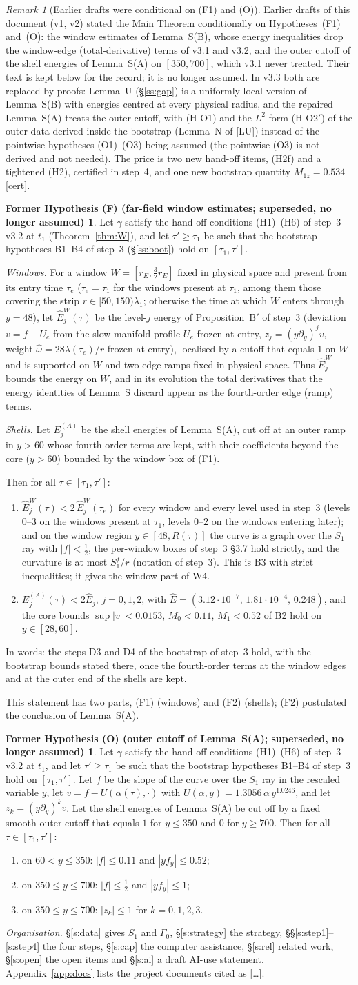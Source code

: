 \documentclass[11pt]{amsart}
\theoremstyle{definition}
\newtheorem*{hypF}{Former Hypothesis (F) (far-field window estimates; superseded, no longer assumed)}
\newtheorem*{hypO}{Former Hypothesis (O) (outer cutoff of Lemma~S(A); superseded, no longer assumed)}
\theoremstyle{remark}
\newtheorem{remark}[theorem]{Remark}
\newcommand{\dref}[1]{[\textsf{#1}]}
\newcommand{\GAPSTATEMENT}{%
Let $\gamma$ satisfy the hand-off conditions \textup{(H1)--(H6)} of step~3 \textup{v3.2} at $t_1$ \textup{(Theorem~\ref{thm:W})}, and let $\tau'\ge\tau_1$ be such that the bootstrap hypotheses \textup{B1--B4} of step~3 \textup{(\S\ref{ss:boot})} hold on $[\tau_1,\tau']$.

\emph{Windows.} For a window $W=[r_E,\frac32r_E]$ fixed in physical space and present from its entry time $\tau_e$ \textup{(}$\tau_e=\tau_1$ for the windows present at $\tau_1$, among them those covering the strip $r\in[50,150)\lambda_1$; otherwise the time at which $W$ enters through $y=48$\textup{)}, let $\hat E^W_j(\tau)$ be the level-$j$ energy of Proposition~B$'$ of step~3 \textup{(}deviation $v=f-U_e$ from the slow-manifold profile $U_e$ frozen at entry, $z_j=(y\partial_y)^jv$, weight $\hat\omega=28\lambda(\tau_e)/r$ frozen at entry\textup{)}, localised by a cutoff that equals $1$ on $W$ and is supported on $W$ and two edge ramps fixed in physical space. Thus $\hat E^W_j$ bounds the energy on $W$, and in its evolution the total derivatives that the energy identities of Lemma~S discard appear as the fourth-order edge \textup{(}ramp\textup{)} terms.

\emph{Shells.} Let $E^{(A)}_j$ be the shell energies of Lemma~S\textup{(A)}, cut off at an outer ramp in $y>60$ whose fourth-order terms are kept, with their coefficients beyond the core \textup{(}$y>60$\textup{)} bounded by the window box of \textup{(F1)}.

Then for all $\tau\in[\tau_1,\tau']$:
\begin{enumerate}[label=\textup{(F\arabic*)},leftmargin=2.6em,itemsep=1pt]
\item $\hat E^W_j(\tau)<2\,\hat E^W_j(\tau_e)$ for every window and every level used in step~3 \textup{(}levels $0$--$3$ on the windows present at $\tau_1$, levels $0$--$2$ on the windows entering later\textup{)}; and on the window region $y\in[48,R(\tau)]$ the curve is a graph over the $S_1$ ray with $|f|<\frac12$, the per-window boxes of step~3 \textup{\S3.7} hold strictly, and the curvature is at most $S^f_1/r$ \textup{(}notation of step~3\textup{)}. This is \textup{B3} with strict inequalities; it gives the window part of \textup{W4}.
\item $E^{(A)}_j(\tau)<2\hat E_j$, $j=0,1,2$, with $\hat E=(3.12\cdot10^{-7},\,1.81\cdot10^{-4},\,0.248)$, and the core bounds $\sup|v|<0.0153$, $M_0<0.11$, $M_1<0.52$ of \textup{B2} hold on $y\in[28,60]$.
\end{enumerate}
In words: the steps \textup{D3} and \textup{D4} of the bootstrap of step~3 hold, with the bootstrap bounds stated there, once the fourth-order terms at the window edges and at the outer end of the shells are kept.}
\begin{document}
\begin{remark}[Earlier drafts were conditional on (F1) and (O)]\label{rem:hist}
Earlier drafts of this document (v1, v2) stated the Main Theorem conditionally on Hypotheses~(F1) and~(O): the window estimates of Lemma~S(B), whose energy inequalities drop the window-edge (total-derivative) terms of v3.1 and v3.2, and the outer cutoff of the shell energies of Lemma~S(A) on $[350,700]$, which v3.1 never treated. Their text is kept below for the record; it is no longer assumed. In v3.3 both are replaced by proofs: Lemma~U (\S\ref{ss:gap}) is a uniformly local version of Lemma~S(B) with energies centred at every physical radius, and the repaired Lemma~S(A) treats the outer cutoff, with (H-O1) and the $L^2$ form (H-O2$'$) of the outer data derived inside the bootstrap (Lemma~N of \dref{LU}) instead of the pointwise hypotheses (O1)--(O3) being assumed (the pointwise (O3) is not derived and not needed). The price is two new hand-off items, (H2f) and a tightened (H2), certified in step~4, and one new bootstrap quantity $M_{1z}=0.534$ \textup{[cert]}.
\begin{hypF}
\GAPSTATEMENT
\end{hypF}
This statement has two parts, \textup{(F1)} (windows) and \textup{(F2)} (shells); (F2) postulated the conclusion of Lemma~S(A).
\begin{hypO}
Let $\gamma$ satisfy the hand-off conditions \textup{(H1)--(H6)} of step~3 \textup{v3.2} at $t_1$, and let $\tau'\ge\tau_1$ be such that the bootstrap hypotheses \textup{B1--B4} of step~3 hold on $[\tau_1,\tau']$. Let $f$ be the slope of the curve over the $S_1$ ray in the rescaled variable $y$, let $v=f-U(\alpha(\tau),\cdot)$ with $U(\alpha,y)=1.3056\,\alpha\,y^{1.0246}$, and let $z_k=(y\partial_y)^kv$. Let the shell energies of Lemma~S\textup{(A)} be cut off by a fixed smooth outer cutoff that equals $1$ for $y\le350$ and $0$ for $y\ge700$. Then for all $\tau\in[\tau_1,\tau']$:
\begin{enumerate}[label=\textup{(O\arabic*)},leftmargin=2.6em,itemsep=1pt]
\item on $60<y\le350$: $|f|\le0.11$ and $|yf_y|\le0.52$;
\item on $350\le y\le700$: $|f|\le\frac12$ and $|yf_y|\le1$;
\item on $350\le y\le700$: $|z_k|\le1$ for $k=0,1,2,3$.
\end{enumerate}
\end{hypO}
\end{remark}

\noindent\emph{Organisation.} \S\ref{s:data} gives $S_1$ and $\Gamma_0$, \S\ref{s:strategy} the strategy, \S\S\ref{s:step1}--\ref{s:step4} the four steps, \S\ref{s:cap} the computer assistance, \S\ref{s:rel} related work, \S\ref{s:open} the open items and \S\ref{s:ai} a draft AI-use statement. Appendix~\ref{app:docs} lists the project documents cited as \dref{\dots}.
\end{document}
